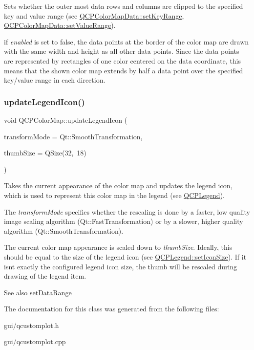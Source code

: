 Sets whether the outer most data rows and columns are clipped to the specified key and value range (see \hyperlink{classQCPColorMapData_a0738c485f3c9df9ea1241b7a8bb6a86e}{Q\+C\+P\+Color\+Map\+Data\+::set\+Key\+Range}, \hyperlink{classQCPColorMapData_ada1b2680ba96a5f4175b6d341cf75d23}{Q\+C\+P\+Color\+Map\+Data\+::set\+Value\+Range}).

if {\itshape enabled} is set to false, the data points at the border of the color map are drawn with the same width and height as all other data points. Since the data points are represented by rectangles of one color centered on the data coordinate, this means that the shown color map extends by half a data point over the specified key/value range in each direction.

\mbox{\label{classQCPColorMap_a5d8158b62d55fcfeaabcb68ce0083e87}} 
\subsubsection{\texorpdfstring{update\+Legend\+Icon()}{updateLegendIcon()}}
{\footnotesize\ttfamily void Q\+C\+P\+Color\+Map\+::update\+Legend\+Icon (\begin{DoxyParamCaption}\item[{Qt\+::\+Transformation\+Mode}]{transform\+Mode = {\ttfamily Qt\+:\+:SmoothTransformation},  }\item[{const Q\+Size \&}]{thumb\+Size = {\ttfamily QSize(32,~18)} }\end{DoxyParamCaption})}

Takes the current appearance of the color map and updates the legend icon, which is used to represent this color map in the legend (see \hyperlink{classQCPLegend}{Q\+C\+P\+Legend}).

The {\itshape transform\+Mode} specifies whether the rescaling is done by a faster, low quality image scaling algorithm (Qt\+::\+Fast\+Transformation) or by a slower, higher quality algorithm (Qt\+::\+Smooth\+Transformation).

The current color map appearance is scaled down to {\itshape thumb\+Size}. Ideally, this should be equal to the size of the legend icon (see \hyperlink{classQCPLegend_a8b0740cce488bf7010da6beda6898984}{Q\+C\+P\+Legend\+::set\+Icon\+Size}). If it isn\textquotesingle{}t exactly the configured legend icon size, the thumb will be rescaled during drawing of the legend item.

\begin{DoxySeeAlso}{See also}
\hyperlink{classQCPColorMap_a980b42837821159786a85b4b7dcb8774}{set\+Data\+Range} 
\end{DoxySeeAlso}


The documentation for this class was generated from the following files\+:\begin{DoxyCompactItemize}
\item 
gui/qcustomplot.\+h\item 
gui/qcustomplot.\+cpp\end{DoxyCompactItemize}
